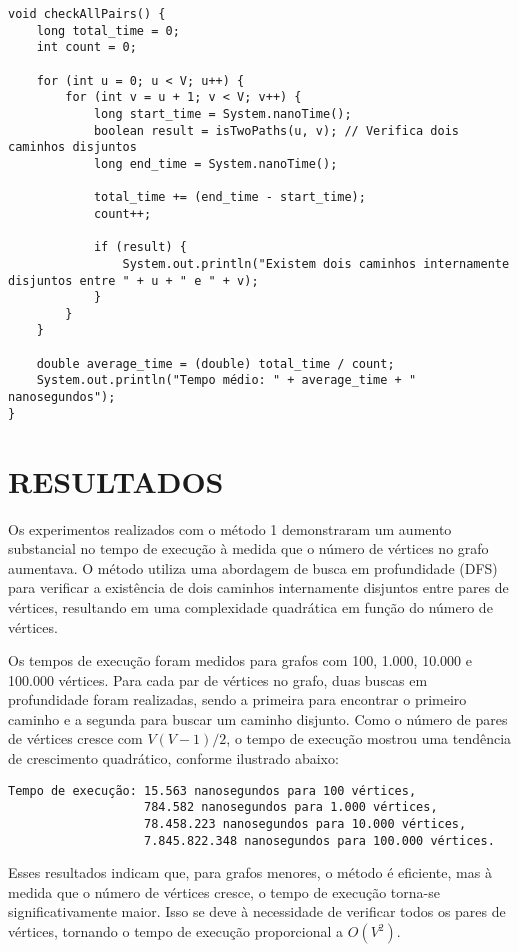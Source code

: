 \begin{verbatim}
void checkAllPairs() {
    long total_time = 0;
    int count = 0;
    
    for (int u = 0; u < V; u++) {
        for (int v = u + 1; v < V; v++) {
            long start_time = System.nanoTime();
            boolean result = isTwoPaths(u, v); // Verifica dois caminhos disjuntos
            long end_time = System.nanoTime();
            
            total_time += (end_time - start_time);
            count++;
            
            if (result) {
                System.out.println("Existem dois caminhos internamente disjuntos entre " + u + " e " + v);
            }
        }
    }
    
    double average_time = (double) total_time / count;
    System.out.println("Tempo médio: " + average_time + " nanosegundos");
}
\end{verbatim}

\section{\esp RESULTADOS}

Os experimentos realizados com o método 1 demonstraram um aumento substancial no tempo de execução à medida que o número de vértices no grafo aumentava. O método utiliza uma abordagem de busca em profundidade (DFS) para verificar a existência de dois caminhos internamente disjuntos entre pares de vértices, resultando em uma complexidade quadrática em função do número de vértices.

Os tempos de execução foram medidos para grafos com 100, 1.000, 10.000 e 100.000 vértices. Para cada par de vértices no grafo, duas buscas em profundidade foram realizadas, sendo a primeira para encontrar o primeiro caminho e a segunda para buscar um caminho disjunto. Como o número de pares de vértices cresce com \( V(V-1)/2 \), o tempo de execução mostrou uma tendência de crescimento quadrático, conforme ilustrado abaixo:

\begin{verbatim}
Tempo de execução: 15.563 nanosegundos para 100 vértices,
                   784.582 nanosegundos para 1.000 vértices,
                   78.458.223 nanosegundos para 10.000 vértices,
                   7.845.822.348 nanosegundos para 100.000 vértices.
\end{verbatim}

Esses resultados indicam que, para grafos menores, o método é eficiente, mas à medida que o número de vértices cresce, o tempo de execução torna-se significativamente maior. Isso se deve à necessidade de verificar todos os pares de vértices, tornando o tempo de execução proporcional a \( O(V^2) \).




